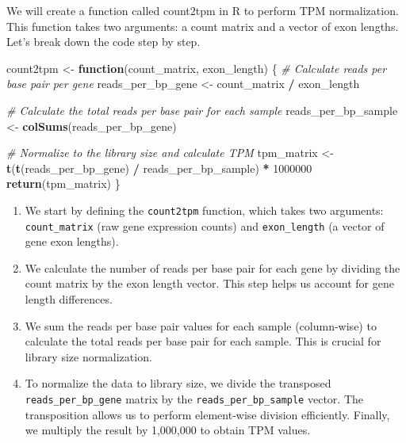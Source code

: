 \documentclass[
]{book}
\newenvironment{Shaded}{\begin{snugshade}}{\end{snugshade}}
\newcommand{\CommentTok}[1]{\textcolor[rgb]{0.56,0.35,0.01}{\textit{#1}}}
\newcommand{\ControlFlowTok}[1]{\textcolor[rgb]{0.13,0.29,0.53}{\textbf{#1}}}
\newcommand{\DecValTok}[1]{\textcolor[rgb]{0.00,0.00,0.81}{#1}}
\newcommand{\FunctionTok}[1]{\textcolor[rgb]{0.13,0.29,0.53}{\textbf{#1}}}
\newcommand{\NormalTok}[1]{#1}
\newcommand{\OtherTok}[1]{\textcolor[rgb]{0.56,0.35,0.01}{#1}}
\newcommand{\SpecialCharTok}[1]{\textcolor[rgb]{0.81,0.36,0.00}{\textbf{#1}}}
\begin{document}
We will create a function called count2tpm in R to perform TPM normalization. This function takes two arguments: a count matrix and a vector of exon lengths. Let's break down the code step by step.

\begin{Shaded}
\begin{Highlighting}[]
\NormalTok{count2tpm }\OtherTok{\textless{}{-}} \ControlFlowTok{function}\NormalTok{(count\_matrix, exon\_length) \{}
  \CommentTok{\# Calculate reads per base pair per gene}
\NormalTok{  reads\_per\_bp\_gene }\OtherTok{\textless{}{-}}\NormalTok{ count\_matrix }\SpecialCharTok{/}\NormalTok{ exon\_length}
  
  \CommentTok{\# Calculate the total reads per base pair for each sample}
\NormalTok{  reads\_per\_bp\_sample }\OtherTok{\textless{}{-}} \FunctionTok{colSums}\NormalTok{(reads\_per\_bp\_gene)}
  
  \CommentTok{\# Normalize to the library size and calculate TPM}
\NormalTok{  tpm\_matrix }\OtherTok{\textless{}{-}} \FunctionTok{t}\NormalTok{(}\FunctionTok{t}\NormalTok{(reads\_per\_bp\_gene) }\SpecialCharTok{/}\NormalTok{ reads\_per\_bp\_sample) }\SpecialCharTok{*} \DecValTok{1000000}
  \FunctionTok{return}\NormalTok{(tpm\_matrix)}
\NormalTok{\}}
\end{Highlighting}
\end{Shaded}

\begin{enumerate}
\def\labelenumi{\arabic{enumi}.}
\item
  We start by defining the \texttt{count2tpm} function, which takes two arguments: \texttt{count\_matrix} (raw gene expression counts) and \texttt{exon\_length} (a vector of gene exon lengths).
\item
  We calculate the number of reads per base pair for each gene by dividing the count matrix by the exon length vector. This step helps us account for gene length differences.
\item
  We sum the reads per base pair values for each sample (column-wise) to calculate the total reads per base pair for each sample. This is crucial for library size normalization.
\item
  To normalize the data to library size, we divide the transposed \texttt{reads\_per\_bp\_gene} matrix by the \texttt{reads\_per\_bp\_sample} vector. The transposition allows us to perform element-wise division efficiently. Finally, we multiply the result by 1,000,000 to obtain TPM values.
\end{enumerate}
\end{document}
